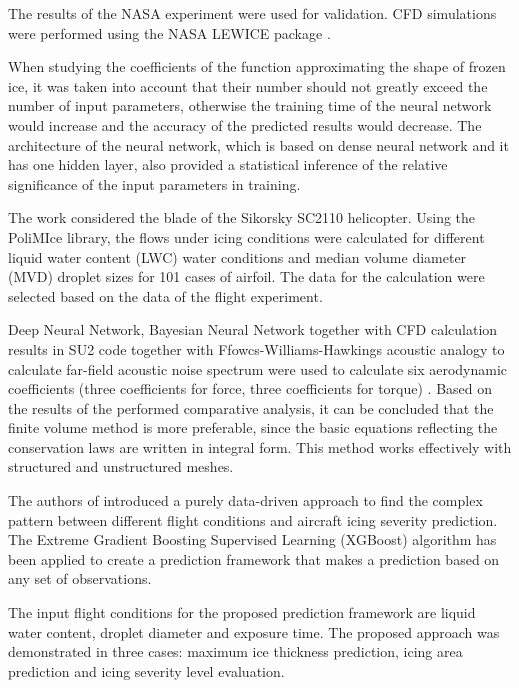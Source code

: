 \documentclass[aerospace,article,submit,moreauthors,pdftex]{Definitions/mdpi}
\begin{document}
The results of the NASA experiment were used for validation. CFD simulations were performed using the NASA LEWICE package \cite{Wright2002}.

When studying the coefficients of the function approximating the shape of frozen ice, it was taken into account that their number should not greatly exceed the number of input parameters, otherwise the training time of the neural network would increase and the accuracy of the predicted results would decrease. The architecture of the neural network, which is based on dense neural network and it has one hidden layer, also provided a statistical inference of the relative significance of the input parameters in training.

The work \cite{ZhouGauger2019} considered the blade of the Sikorsky SC2110 helicopter. Using the PoliMIce library, the flows under icing conditions were calculated for different liquid water content (LWC) water conditions and median volume diameter (MVD) droplet sizes for 101 cases of airfoil. The data for the calculation were selected based on the data of the flight experiment. 

Deep Neural Network, Bayesian Neural Network together with CFD calculation results in SU2 code together with Ffowcs-Williams-Hawkings acoustic analogy to calculate far-field acoustic noise spectrum were used to calculate six aerodynamic coefficients (three coefficients for force, three coefficients for torque) 
\cite{ZhouGauger2019}. 
Based on the results of the performed comparative analysis, it can be concluded that the finite volume method is more preferable, since the basic equations reflecting the conservation laws are written in integral form. This method works effectively with structured and unstructured meshes.

The authors of \cite{LiQinHePaoli2020} introduced a purely data-driven approach to find the complex pattern between different flight conditions and aircraft icing severity prediction. The Extreme Gradient Boosting Supervised Learning (XGBoost) algorithm has been applied to create a prediction framework that makes a prediction based on any set of observations.

The input flight conditions for the proposed prediction framework are liquid water content, droplet diameter and exposure time. The proposed approach was demonstrated in three cases: maximum ice thickness prediction, icing area prediction and icing severity level evaluation.
\end{document}
